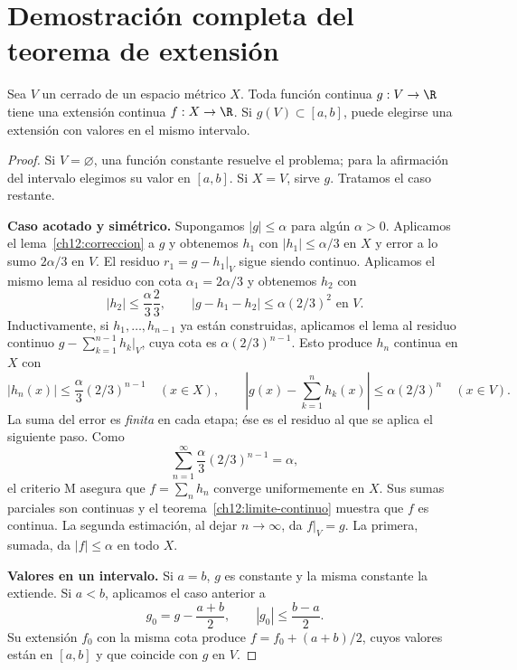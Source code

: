 \section{Demostración completa del teorema de extensión}
\begin{teorema}[Tietze]\label{ch12:tietze}
Sea $V$ un cerrado de un espacio métrico $X$. Toda función continua $g:V\to\R$ tiene una extensión continua $f:X\to\R$. Si $g(V)\subset[a,b]$, puede elegirse una extensión con valores en el mismo intervalo.
\end{teorema}
\begin{proof}
Si $V=\varnothing$, una función constante resuelve el problema; para la afirmación del intervalo elegimos su valor en $[a,b]$. Si $X=V$, sirve $g$. Tratamos el caso restante.

\textbf{Caso acotado y simétrico.} Supongamos $|g|\leq\alpha$ para algún $\alpha>0$. Aplicamos el lema~\ref{ch12:correccion} a $g$ y obtenemos $h_1$ con $|h_1|\leq\alpha/3$ en $X$ y error a lo sumo $2\alpha/3$ en $V$. El residuo $r_1=g-h_1|_V$ sigue siendo continuo. Aplicamos el mismo lema al residuo con cota $\alpha_1=2\alpha/3$ y obtenemos $h_2$ con
\[
 |h_2|\leq\frac\alpha3\frac23,
 \qquad |g-h_1-h_2|\leq\alpha(2/3)^2\text{ en }V.
\]
Inductivamente, si $h_1,\ldots,h_{n-1}$ ya están construidas, aplicamos el lema al residuo continuo $g-\sum_{k=1}^{n-1}h_k|_V$, cuya cota es $\alpha(2/3)^{n-1}$. Esto produce $h_n$ continua en $X$ con
\[
 |h_n(x)|\leq\frac\alpha3(2/3)^{n-1}\quad(x\in X),
 \qquad
 \left|g(x)-\sum_{k=1}^nh_k(x)\right|\leq\alpha(2/3)^n\quad(x\in V).
\]
La suma del error es \emph{finita} en cada etapa; ése es el residuo al que se aplica el siguiente paso. Como
\[
 \sum_{n=1}^\infty\frac\alpha3(2/3)^{n-1}=\alpha,
\]
el criterio M asegura que $f=\sum_nh_n$ converge uniformemente en $X$. Sus sumas parciales son continuas y el teorema~\ref{ch12:limite-continuo} muestra que $f$ es continua. La segunda estimación, al dejar $n\to\infty$, da $f|_V=g$. La primera, sumada, da $|f|\leq\alpha$ en todo $X$.

\textbf{Valores en un intervalo.} Si $a=b$, $g$ es constante y la misma constante la extiende. Si $a<b$, aplicamos el caso anterior a
\[
 g_0=g-\frac{a+b}{2},\qquad |g_0|\leq\frac{b-a}{2}.
\]
Su extensión $f_0$ con la misma cota produce $f=f_0+(a+b)/2$, cuyos valores están en $[a,b]$ y que coincide con $g$ en $V$.


\end{proof}
